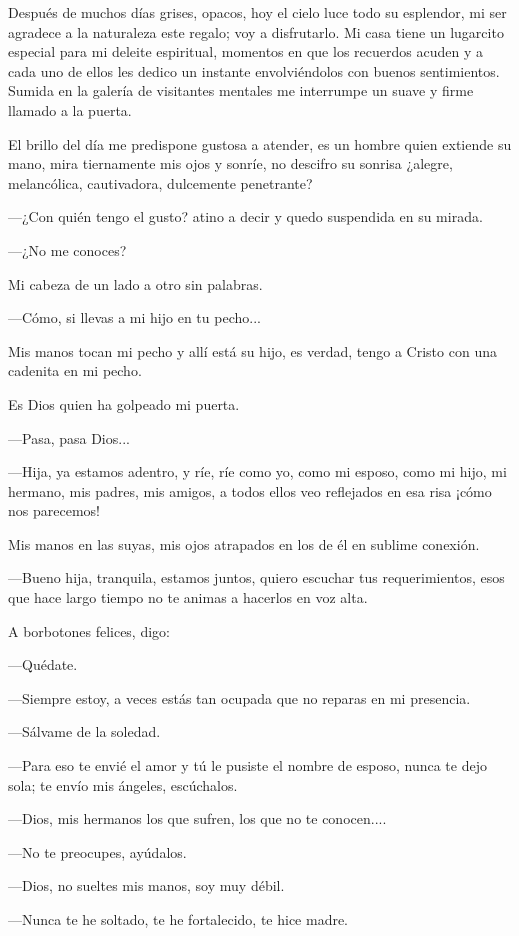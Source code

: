 \documentclass[11pt,twoside,openright,a5paper]{book}
\begin{document}
Después de muchos días grises, opacos, hoy el cielo luce todo su esplendor, mi ser agradece a la naturaleza este regalo; voy a disfrutarlo. Mi casa tiene un lugarcito especial para mi deleite espiritual, momentos en que los recuerdos acuden y a cada uno de ellos les dedico un instante envolviéndolos con buenos sentimientos. Sumida en la galería de visitantes mentales me interrumpe un suave y firme llamado a la puerta.

El brillo del día me predispone gustosa a atender, es un hombre quien extiende su mano, mira tiernamente mis ojos y sonríe, no descifro su sonrisa ¿alegre, melancólica, cautivadora, dulcemente penetrante?

---¿Con quién tengo el gusto? atino a decir y  quedo suspendida en su mirada.

---¿No me conoces? 

Mi cabeza de un lado a otro sin palabras.

---Cómo, si llevas a mi hijo en tu pecho...

Mis manos tocan mi pecho  y allí está su hijo, es verdad, tengo a Cristo con una cadenita en mi pecho.

Es Dios quien ha golpeado mi puerta.

---Pasa, pasa Dios...

---Hija, ya estamos adentro, y ríe, ríe como yo, como mi esposo, como mi hijo, mi hermano, mis padres, mis amigos, a todos ellos veo reflejados en esa risa ¡cómo nos parecemos!

Mis manos en las suyas, mis ojos atrapados en los de él en sublime conexión.

---Bueno hija, tranquila, estamos juntos, quiero escuchar tus requerimientos, esos que hace largo tiempo no te animas a hacerlos en voz alta.

A borbotones felices, digo:

---Quédate.

---Siempre estoy, a veces estás tan ocupada que no reparas en mi presencia.

---Sálvame de la soledad.

---Para eso te envié el amor y tú le pusiste el nombre de esposo, nunca te dejo sola; te envío mis ángeles, escúchalos.

---Dios, mis hermanos los que sufren,  los que no te conocen....

---No te preocupes, ayúdalos.

---Dios, no sueltes mis manos, soy muy débil.

---Nunca te he soltado, te he fortalecido, te hice madre.
\end{document}

